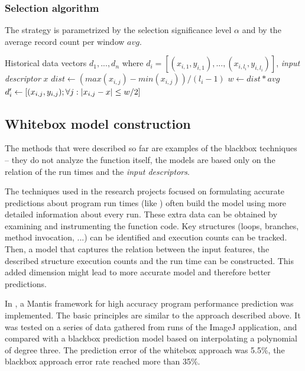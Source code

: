 \subsubsection{Selection algorithm}

The strategy is parametrized by the selection significance level $\alpha$ and by the average record count per window $avg$.

\begin{algorithmic}[1] %
	\INPUT Historical data vectors $d_1,...,d_n$ where $d_i = [(x_{i,1}, y_{i,1}),...,(x_{i,l_i}, y_{i,l_i})]$, \textit{input descriptor} $x$
	\State $dist \gets (max(x_{i,j}) - min(x_{i,j})) / (l_i-1)$
	\State $w \gets dist * avg$
	\State $d'_i \gets [(x_{i,j}, y_{i, j}); \forall j: \left|{x_{i,j} - x}\right| \leq w/2]$
	\EndFor
	\State {}
\end{algorithmic}

\subsection{Whitebox model construction}

The methods that were described so far are examples of the blackbox techniques -- they do not analyze the function itself, the models are based only on the relation of the run times and the \textit{input descriptors}. 

The techniques used in the research projects focused on formulating accurate predictions about program run times (like \cite{goldsmith_measuring_2007,chun_mantis:_2010,huang_predicting_2010}) often build the model using more detailed information about every run. These extra data can be obtained by examining and instrumenting the function code. Key structures (loops, branches, method invocation, ...) can be identified and execution counts can be tracked. Then, a model that captures the relation between the input features, the described structure execution counts and the run time can be constructed. This added dimension might lead to more accurate model and therefore better predictions.

In \cite{chun_mantis:_2010}, a Mantis framework for high accuracy program performance prediction was implemented. The basic principles are similar to the approach described above. It was tested on a series of data gathered from runs of the ImageJ application, and compared with a blackbox prediction model based on interpolating a polynomial of degree three. The prediction error of the whitebox approach was 5.5\%, the blackbox approach error rate reached more than 35\%.

